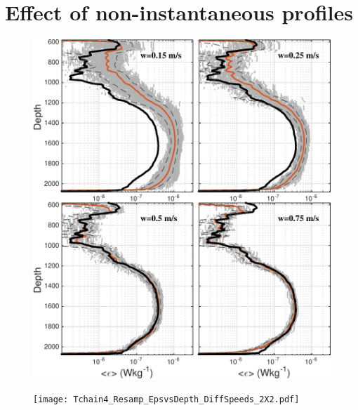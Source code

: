 \documentclass[11pt]{article}
\begin{document}
\newpage
\clearpage
\section{Effect of non-instantaneous profiles}


\begin{figure}[htbp]
\includegraphics[scale=0.8]{Tchain3_Resamp_EpsvsDepth_DiffSpeeds_2X2.pdf}
\caption{}
\label{}
\end{figure}

\begin{figure}[htbp]
\texttt{[image: Tchain4\_Resamp\_EpsvsDepth\_DiffSpeeds\_2X2.pdf]}
\caption{}
\label{}
\end{figure}
\end{document}
